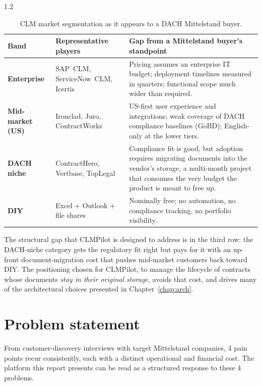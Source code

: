 \begin{spacing}{1.2}
\begin{table}[H]
  \centering
  \caption{CLM market segmentation as it appears to a DACH Mittelstand
           buyer.}
  \footnotesize
  \begin{tabularx}{\linewidth}{|>{\bfseries}l|X|X|}
    \hline
    Band & Representative players & Gap from a Mittelstand buyer's standpoint \\
    \hline\hline
    Enterprise & SAP~CLM, ServiceNow~CLM, Icertis & Pricing assumes an
      enterprise IT budget; deployment timelines measured in quarters;
      functional scope much wider than required. \\
    \hline
    Mid-market (US) & Ironclad, Juro, ContractWorks & US-first user
      experience and integrations; weak coverage of DACH compliance
      baselines (GoBD); English-only at the lower tiers. \\
    \hline
    DACH niche & ContractHero, Vertbase, TopLegal & Compliance fit is good,
      but adoption requires migrating documents into the vendor's storage,
      a multi-month project that consumes the very budget the
      product is meant to free up. \\
    \hline
    DIY & Excel + Outlook + file shares & Nominally free; no
      automation, no compliance tracking, no portfolio visibility. \\
    \hline
  \end{tabularx}
  \label{tab:clm-segmentation}
\end{table}

The structural gap that CLMPilot is designed to address is in the third
row: the DACH-niche category gets the regulatory fit right but pays for it
with an up-front document-migration cost that pushes mid-market customers back
toward DIY. The positioning chosen for CLMPilot, to manage the lifecycle
of contracts whose documents \textit{stay in their original storage},
avoids that cost, and drives many of the architectural choices presented in
Chapter~\ref{chap:arch}.

\section{Problem statement}
\label{sec:problem-statement}

From customer-discovery interviews with target Mittelstand companies, 4
pain points recur consistently, each with a distinct operational and
financial cost. The platform this report presents can be read as a
structured response to these 4 problems.


\end{spacing}
